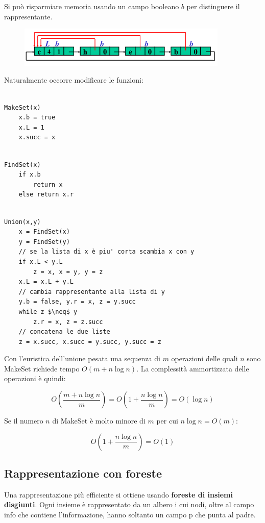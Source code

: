 Si può risparmiare memoria usando un campo booleano $b$ per distinguere il rappresentante.

\begin{figure}[htpd]
\centering
\includegraphics[width=100mm]{images/euristic2.png}
\end{figure}

Naturalmente occorre modificare le funzioni:

\begin{lstlisting}

MakeSet(x)
	x.b = true
	x.L = 1
	x.succ = x

\end{lstlisting}

\begin{lstlisting}

FindSet(x)
	if x.b
		return x
	else return x.r

\end{lstlisting}

\begin{lstlisting}[mathescape=true]

Union(x,y)
	x = FindSet(x)
	y = FindSet(y)
	// se la lista di x è piu' corta scambia x con y
	if x.L < y.L
		z = x, x = y, y = z
	x.L = x.L + y.L
	// cambia rappresentante alla lista di y
	y.b = false, y.r = x, z = y.succ
	while z $\neq$ y
		z.r = x, z = z.succ
	// concatena le due liste
	z = x.succ, x.succ = y.succ, y.succ = z

\end{lstlisting}

Con l'euristica dell'unione pesata una sequenza di $m$ operazioni delle quali $n$ sono MakeSet richiede tempo $O(m+n\log n)$. La complessità ammortizzata delle operazioni è quindi:

$$O(\frac{m+n\log n}{m})=O(1+\frac{n\log n}{m})=O(\log n)$$

Se il numero $n$ di MakeSet è molto minore di $m$ per cui $n\log n=O(m)$:

$$O(1+\frac{n\log n}{m}) = O(1)$$

\subsection{Rappresentazione con foreste}

Una rappresentazione più efficiente si ottiene usando \textbf{foreste di insiemi disgiunti}. Ogni insieme è rappresentato da un albero i cui nodi, oltre al campo info che contiene l'informazione, hanno soltanto un campo p che punta al padre.

